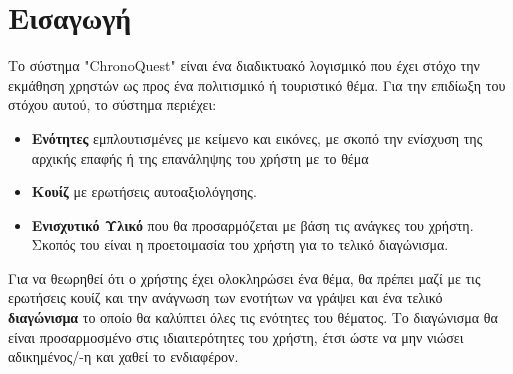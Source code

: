 \section{Εισαγωγή}
Το σύστημα "\textlatin{ChronoQuest}" είναι ένα διαδικτυακό λογισμικό που έχει στόχο την εκμάθηση χρηστών ως προς ένα πολιτισμικό ή τουριστικό θέμα. Για την επιδίωξη του στόχου αυτού, το σύστημα περιέχει:
\begin{itemize}
    \item \textbf{Ενότητες} εμπλουτισμένες με κείμενο και εικόνες, με σκοπό την ενίσχυση της αρχικής επαφής ή της επανάληψης του χρήστη με το θέμα
    \item \textbf{Κουίζ} με ερωτήσεις αυτοαξιολόγησης.
     \item \textbf{Ενισχυτικό Υλικό} που θα προσαρμόζεται με βάση τις ανάγκες του χρήστη. Σκοπός του είναι η προετοιμασία του χρήστη για το τελικό διαγώνισμα.
\end{itemize}

Για να θεωρηθεί ότι ο χρήστης έχει ολοκληρώσει ένα θέμα, θα πρέπει μαζί με τις ερωτήσεις κουίζ και την ανάγνωση των ενοτήτων να γράψει και ένα τελικό \textbf{διαγώνισμα} το οποίο θα καλύπτει όλες τις ενότητες του θέματος. Το διαγώνισμα θα είναι προσαρμοσμένο στις ιδιαιτερότητες του χρήστη, έτσι ώστε να μην νιώσει αδικημένος/-η και χαθεί το ενδιαφέρον.